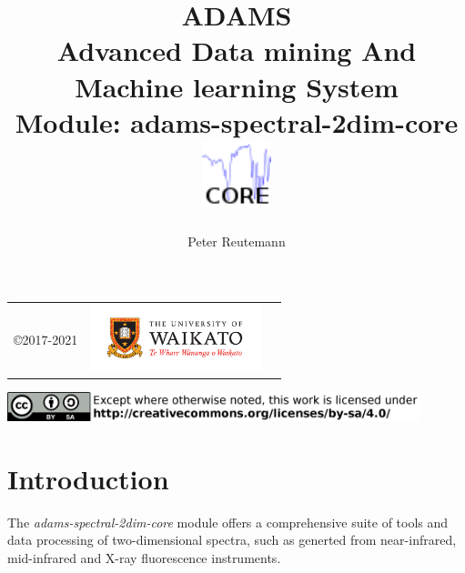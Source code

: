 \documentclass[a4paper]{book}
\title{
  \textbf{ADAMS} \\
  {\Large \textbf{A}dvanced \textbf{D}ata mining \textbf{A}nd \textbf{M}achine
  learning \textbf{S}ystem} \\
  {\Large Module: adams-spectral-2dim-core} \\
  \vspace{1cm}
  \includegraphics[width=2cm]{images/spectral-2dim-core-module.png} \\
}
\author{
  Peter Reutemann
}
\begin{document}
\begin{titlepage}
\maketitle

\thispagestyle{empty}
\center
\begin{table}[b]
	\begin{tabular}{c l l}
		\parbox[c][2cm]{2cm}{\copyright 2017-2021} &
		\parbox[c][2cm]{5cm}{\includegraphics[width=5cm]{images/coat_of_arms.pdf}} \\
	\end{tabular}
	\includegraphics[width=12cm]{images/cc.png} \\
\end{table}

\end{titlepage}

\tableofcontents
\listoffigures

\chapter{Introduction}
The \textit{adams-spectral-2dim-core} module offers a comprehensive suite
of tools and data processing of two-dimensional spectra, such as generted from
near-infrared\cite{nir}, mid-infrared\cite{mir} and X-ray fluorescence\cite{xrf}
instruments.

\end{document}
